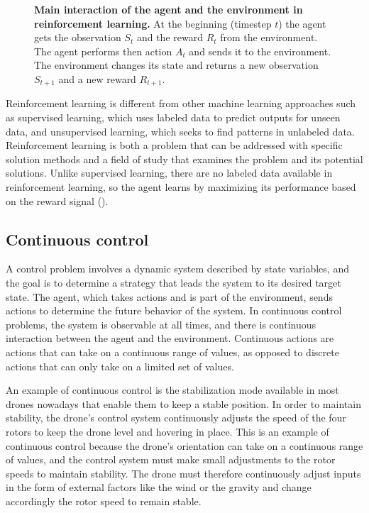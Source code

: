 \begin{figure}[!ht]
\centering
{}
\caption[Main interaction of the agent and the environment in reinforcement learning]{
  \textbf{Main interaction of the agent and the environment in reinforcement learning.}
  At the beginning (timestep $t$) the agent gets the observation $S_t$ and the reward $R_t$ from the environment. The agent performs then action $A_t$ and sends it to the environment. The environment changes its state and returns a new observation $S_{t+1}$ and a new reward $R_{t+1}$.
 }
\label{fig:RL_main_loop}
\end{figure}

Reinforcement learning is different from other machine learning approaches such as supervised learning, which uses labeled data to predict outputs for unseen data, and unsupervised learning, which seeks to find patterns in unlabeled data. Reinforcement learning is both a problem that can be addressed with specific solution methods and a field of study that examines the problem and its potential solutions. Unlike supervised learning, there are no labeled data available in reinforcement learning, so the agent learns by maximizing its performance based on the reward signal (\cite{sutton_reinforcement_1998,sutton_reinforcement_2018}).

\subsection{Continuous control}
A control problem involves a dynamic system described by state variables, and the goal is to determine a strategy that leads the system to its desired target state. The agent, which takes actions and is part of the environment, sends actions to determine the future behavior of the system. In continuous control problems, the system is observable at all times, and there is continuous interaction between the agent and the environment. Continuous actions are actions that can take on a continuous range of values, as opposed to discrete actions that can only take on a limited set of values.

An example of continuous control is the stabilization mode available in most drones nowadays that enable them to keep a stable position. In order to maintain stability, the drone's control system continuously adjusts the speed of the four rotors to keep the drone level and hovering in place. This is an example of continuous control because the drone's orientation can take on a continuous range of values, and the control system must make small adjustments to the rotor speeds to maintain stability. The drone must therefore continuously adjust inputs in the form of external factors like the wind or the gravity and change accordingly the rotor speed to remain stable.

